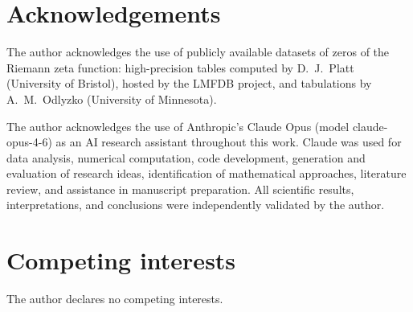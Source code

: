 \documentclass[10pt]{article}
\begin{document}
\section*{Acknowledgements}
The author acknowledges the use of publicly available datasets of zeros
of the Riemann zeta function: high-precision tables computed by
D.~J.~Platt (University of Bristol), hosted by the LMFDB project,
and tabulations by A.~M.~Odlyzko (University of Minnesota).

The author acknowledges the use of Anthropic's Claude Opus
(model claude-opus-4-6) as an AI research assistant throughout this work.
Claude was used for data analysis, numerical computation, code development,
generation and evaluation of research ideas, identification of mathematical
approaches, literature review, and assistance in manuscript preparation.
All scientific results, interpretations, and conclusions were independently
validated by the author.

\section*{Competing interests}
The author declares no competing interests.




\end{document}
